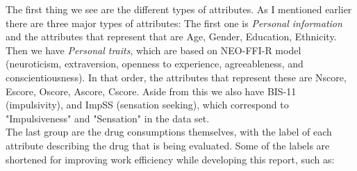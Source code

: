 \documentclass{article}\usepackage[]{graphicx}\usepackage[]{color}
\begin{document}
The first thing we see are the different types of attributes. As I mentioned earlier there are three major types of attributes: The first one is \textit{Personal information} and the attributes that represent that are Age, Gender, Education, Ethnicity. 
\\
Then we have \textit{Personal traits}, which are based on NEO-FFI-R model (neuroticism, extraversion, openness to experience, agreeableness, and conscientiousness). In that order, the attributes that represent these are Nscore, Escore, Oscore, Ascore, Cscore. Aside from this we also have BIS-11 (impulsivity), and ImpSS (sensation seeking), which correspond to "Impulsiveness" and "Sensation" in the data set.
\\
The last group are the drug consumptions themselves, with the label of each attribute describing the drug that is being evaluated. Some of the labels are shortened for improving work efficiency while developing this report, such as:
\end{document}

